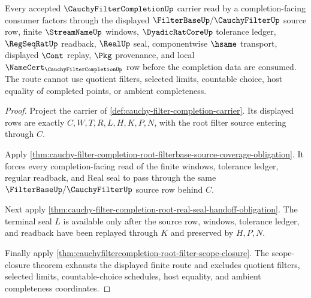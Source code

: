 \begin{theorem}
\label{thm:cauchyfiltercompletion-root-filter-route}
Every accepted $\CauchyFilterCompletionUp$ carrier read by a completion-facing consumer factors through the displayed $\FilterBaseUp/\CauchyFilterUp$ source row, finite $\StreamNameUp$ windows, $\DyadicRatCoreUp$ tolerance ledger, $\RegSeqRatUp$ readback, $\RealUp$ seal, componentwise $\hsame$ transport, displayed $\Cont$ replay, $\Pkg$ provenance, and local $\NameCert_{\CauchyFilterCompletionUp}$ row before the completion data are consumed. The route cannot use quotient filters, selected limits, countable choice, host equality of completed points, or ambient completeness.
\end{theorem}
\begin{proof}
Project the carrier of \autoref{def:cauchy-filter-completion-carrier}. Its displayed rows are exactly $C,W,T,R,L,H,K,P,N$, with the root filter source entering through $C$.

Apply \autoref{thm:cauchy-filter-completion-root-filterbase-source-coverage-obligation}. It forces every completion-facing read of the finite windows, tolerance ledger, regular readback, and Real seal to pass through the same $\FilterBaseUp/\CauchyFilterUp$ source row behind $C$.

Next apply \autoref{thm:cauchy-filter-completion-root-real-seal-handoff-obligation}. The terminal seal $L$ is available only after the source row, windows, tolerance ledger, and readback have been replayed through $K$ and preserved by $H,P,N$.

Finally apply \autoref{thm:cauchyfiltercompletion-root-filter-scope-closure}. The scope-closure theorem exhausts the displayed finite route and excludes quotient filters, selected limits, countable-choice schedules, host equality, and ambient completeness coordinates.
\end{proof}

